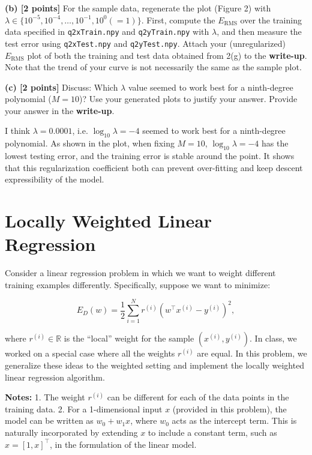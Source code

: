 \documentclass[lang=cn,11pt]{elegantbook}
\begin{document}
\textbf{(b) [2 points]} For the sample data, regenerate the plot (Figure 2) with \( \lambda \in \{10^{-5}, 10^{-4}, \dots, 10^{-1}, 10^0 (= 1)\} \). First, compute the \( E_{\text{RMS}} \) over the training data specified in \texttt{q2xTrain.npy} and \texttt{q2yTrain.npy} with \( \lambda \), and then measure the test error using \texttt{q2xTest.npy} and \texttt{q2yTest.npy}. Attach your (unregularized) \( E_{\text{RMS}} \) plot of both the training and test data obtained from 2(g) to the \textbf{write-up}. Note that the trend of your curve is not necessarily the same as the sample plot.

\textbf{(c) [2 points]} Discuss: Which \( \lambda \) value seemed to work best for a ninth-degree polynomial (\( M = 10 \))? Use your generated plots to justify your answer. Provide your answer in the \textbf{write-up}.
\begin{solution}
    I think $\lambda = 0.0001$, i.e. $\log_{10} \lambda = -4$ seemed to work best for a ninth-degree polynomial. As shown in the plot, when fixing $M=10$,  $\log_{10} \lambda = -4$ has the lowest testing error, and the training error is stable around the point. It shows that this regularization coefficient both can prevent over-fitting and keep descent expressibility of the model.
\end{solution}



\section{Locally Weighted Linear Regression}

Consider a linear regression problem in which we want to weight different training examples differently. Specifically, suppose we want to minimize:

\[
E_D(w) = \frac{1}{2} \sum_{i=1}^N r^{(i)}(w^\top x^{(i)} - y^{(i)})^2,
\]

where \( r^{(i)} \in \mathbb{R} \) is the “local” weight for the sample \( (x^{(i)}, y^{(i)}) \). In class, we worked on a special case where all the weights \( r^{(i)} \) are equal. In this problem, we generalize these ideas to the weighted setting and implement the locally weighted linear regression algorithm.

\textbf{Notes:}
1. The weight \( r^{(i)} \) can be different for each of the data points in the training data.
2. For a 1-dimensional input \( x \) (provided in this problem), the model can be written as \( w_0 + w_1x \), where \( w_0 \) acts as the intercept term. This is naturally incorporated by extending \( x \) to include a constant term, such as \( x = [1, x]^\top \), in the formulation of the linear model.
\end{document}
